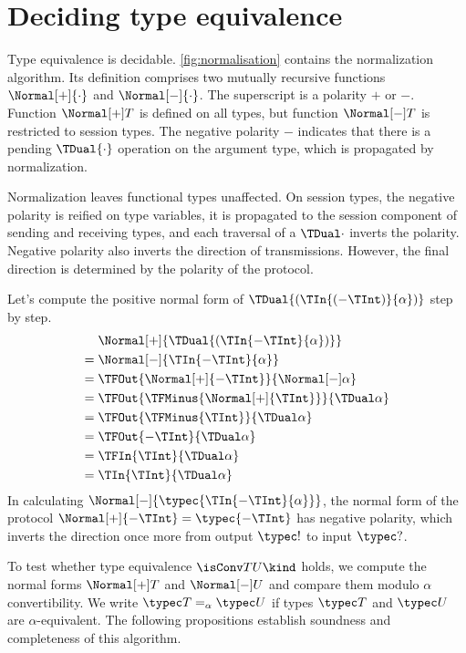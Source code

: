 \section{Deciding type equivalence}
\label{sec:type-equiv}

Type equivalence is decidable. 
\cref{fig:normalisation} contains the normalization algorithm. Its definition comprises two mutually
recursive functions $\Normal[+]{\cdot}$ and $\Normal[-]{\cdot}$. The 
superscript  is a polarity $+$ or $-$.
Function $\Normal[+]T$ is defined on all types, but 
function $\Normal[-]T$ is restricted to session types.
The negative polarity $-$ indicates that there is a pending $\TDual{\cdot}$
operation on the argument type, which is propagated by normalization.

Normalization leaves functional types unaffected. On session types,
the negative polarity is reified on type variables, it is propagated
to the session component of sending and receiving types, and each
traversal of a $\TDual\cdot$ inverts the polarity. Negative polarity also
inverts the direction of transmissions. However, the final direction is
determined by the polarity of the protocol.

\begin{example}
  Let's compute the positive normal form of
  $\TDual{(\TIn{(-\TInt)}{\alpha})}$ step by step.
  \begin{align*}
    & \Normal[+]{\TDual{(\TIn{-\TInt}{\alpha})}} \\
    ={}& \Normal[-]{{\TIn{-\TInt}{\alpha}}} \\
    ={}& \TFOut{\Normal[+]{-\TInt}}{\Normal[-]\alpha} \\
    ={}& \TFOut{\TFMinus{\Normal[+]{\TInt}}}{\TDual\alpha} \\
    ={}& \TFOut{\TFMinus{\TInt}}{\TDual\alpha} \\
    ={}& \TFOut{-{\TInt}}{\TDual\alpha} \\
    ={}& \TFIn{\TInt}{\TDual\alpha} \\
    ={}& \TIn{{\TInt}}{\TDual\alpha}
  \end{align*}
  In calculating $\Normal[-]{\typec{\TIn{-\TInt}{\alpha}}}$, the normal form of the
  protocol $\Normal[+]{-\TInt} = \typec{-\TInt}$ has negative polarity,
  which inverts the direction once more from output $\typec !$ to 
  input $\typec ?$.
\end{example}

To test whether type equivalence $\isConv TU\kind$ holds, we compute
the normal forms $\Normal[+]T$ and $\Normal[-]U$ and compare them
modulo $\alpha$ convertibility. 
We write $\typec T =_\alpha \typec U$ if types $\typec T$ and $\typec U$ are
$\alpha$-equivalent. The following propositions establish soundness and
completeness of this algorithm.


